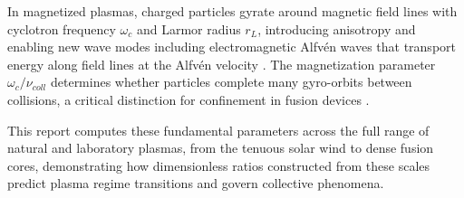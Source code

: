\documentclass[11pt,a4paper]{article}
\begin{document}
In magnetized plasmas, charged particles gyrate around magnetic field lines with cyclotron frequency $\omega_c$ and Larmor radius $r_L$, introducing anisotropy and enabling new wave modes including electromagnetic Alfvén waves that transport energy along field lines at the Alfvén velocity \cite{alfven1942existence}. The magnetization parameter $\omega_c/\nu_{coll}$ determines whether particles complete many gyro-orbits between collisions, a critical distinction for confinement in fusion devices \cite{wesson2011tokamaks}.

This report computes these fundamental parameters across the full range of natural and laboratory plasmas, from the tenuous solar wind to dense fusion cores, demonstrating how dimensionless ratios constructed from these scales predict plasma regime transitions and govern collective phenomena.
\end{document}
